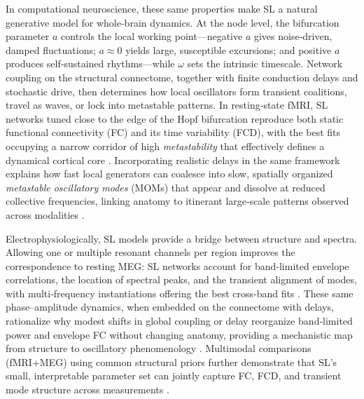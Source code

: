 \documentclass[11pt]{article}
\numberwithin{equation}{section}
\begin{document}
In computational neuroscience, these same properties make SL a natural generative model for whole‑brain dynamics. At the node level, the bifurcation parameter $a$ controls the local working point—negative $a$ gives noise‑driven, damped fluctuations; $a\approx 0$ yields large, susceptible excursions; and positive $a$ produces self‑sustained rhythms—while $\omega$ sets the intrinsic timescale. Network coupling on the structural connectome, together with finite conduction delays and stochastic drive, then determines how local oscillators form transient coalitions, travel as waves, or lock into metastable patterns. In resting‑state fMRI, SL networks tuned close to the edge of the Hopf bifurcation reproduce both static functional connectivity (FC) and its time variability (FCD), with the best fits occupying a narrow corridor of high \emph{metastability} that effectively defines a dynamical cortical core \cite{Deco2017Metastability}. Incorporating realistic delays in the same framework explains how fast local generators can coalesce into slow, spatially organized \emph{metastable oscillatory modes} (MOMs) that appear and dissolve at reduced collective frequencies, linking anatomy to itinerant large‑scale patterns observed across modalities \cite{Cabral2022MOMs}.

Electrophysiologically, SL models provide a bridge between structure and spectra. Allowing one or multiple resonant channels per region improves the correspondence to resting MEG: SL networks account for band‑limited envelope correlations, the location of spectral peaks, and the transient alignment of modes, with multi‑frequency instantiations offering the best cross‑band fits \cite{Deco2017MEG}. These same phase–amplitude dynamics, when embedded on the connectome with delays, rationalize why modest shifts in global coupling or delay reorganize band‑limited power and envelope FC without changing anatomy, providing a mechanistic map from structure to oscillatory phenomenology \cite{Cabral2022MOMs,siebenhuhnerSpectralPatternsMEG2025}. Multimodal comparisons (fMRI+MEG) using common structural priors further demonstrate that SL’s small, interpretable parameter set can jointly capture FC, FCD, and transient mode structure across measurements \cite{castaldo2023multi}.
\end{document}
